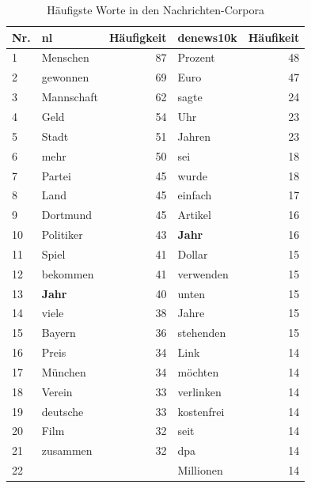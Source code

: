 \documentclass[11pt, a4paper]{article}
\begin{document}
\begin{table}
    \begin{tabular}{l*{2}{lr}}
    \toprule
    Nr. & nl & Häufigkeit & denews10k & Häufikeit\\
    \midrule
    1  & Menschen    & 87 &  Prozent     & 48 \\
    2  & gewonnen    & 69 &  Euro        & 47 \\
    3  & Mannschaft  & 62 &  sagte       & 24 \\
    4  & Geld        & 54 &  Uhr         & 23 \\
    5  & Stadt       & 51 &  Jahren      & 23 \\
    6  & mehr        & 50 &  sei         & 18 \\
    7  & Partei      & 45 &  wurde       & 18 \\
    8  & Land        & 45 &  einfach     & 17 \\
    9  & Dortmund    & 45 &  Artikel     & 16 \\
    10 & Politiker   & 43 &  \textbf{Jahr}        & 16 \\
    11 & Spiel       & 41 &  Dollar      & 15 \\
    12 & bekommen    & 41 &  verwenden   & 15 \\
    13 & \textbf{Jahr}        & 40 &  unten       & 15 \\
    14 & viele       & 38 &  Jahre       & 15 \\
    15 & Bayern      & 36 &  stehenden   & 15 \\
    16 & Preis       & 34 &  Link        & 14 \\
    17 & München     & 34 &  möchten     & 14 \\
    18 & Verein      & 33 &  verlinken   & 14 \\
    19 & deutsche    & 33 &  kostenfrei  & 14 \\
    20 & Film        & 32 &  seit        & 14 \\
    21 & zusammen    & 32 &  dpa         & 14 \\
    22 &             &    &  Millionen   & 14 \\
    \bottomrule
    \end{tabular}
    \caption{Häufigste Worte in den Nachrichten-Corpora}
    \label{words-nachrichten}
\end{table}
\end{document}

